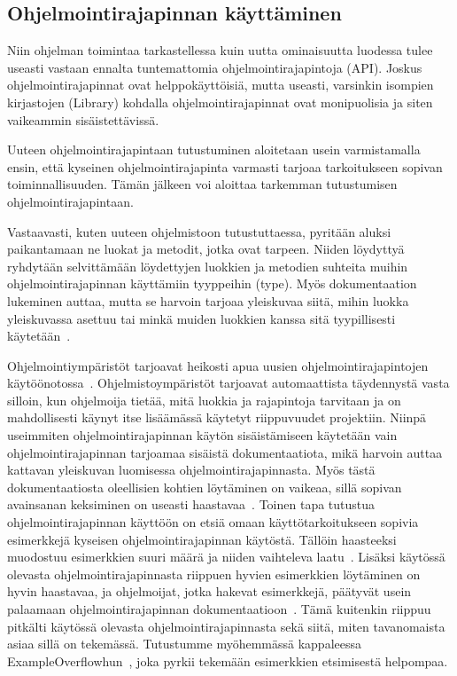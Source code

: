 \documentclass[finnish]{tktltiki2}
\theoremstyle{definition}
\theoremstyle{remark}
\begin{document}
\subsection{Ohjelmointirajapinnan käyttäminen}
Niin ohjelman toimintaa tarkastellessa kuin uutta ominaisuutta luodessa tulee useasti vastaan ennalta tuntemattomia ohjelmointirajapintoja (API). Joskus ohjelmointirajapinnat ovat helppokäyttöisiä, mutta useasti, varsinkin isompien kirjastojen (Library) kohdalla ohjelmointirajapinnat ovat monipuolisia ja siten vaikeammin sisäistettävissä.

Uuteen ohjelmointirajapintaan tutustuminen aloitetaan usein varmistamalla ensin, että kyseinen ohjelmointirajapinta varmasti tarjoaa tarkoitukseen sopivan toiminnallisuuden. Tämän jälkeen voi aloittaa tarkemman tutustumisen ohjelmointirajapintaan.

Vastaavasti, kuten uuteen ohjelmistoon tutustuttaessa, pyritään aluksi paikantamaan ne luokat ja metodit, jotka ovat tarpeen. Niiden löydyttyä ryhdytään selvittämään löydettyjen luokkien ja metodien suhteita muihin ohjelmointirajapinnan käyttämiin tyyppeihin (type). Myös dokumentaation lukeminen auttaa, mutta se harvoin tarjoaa yleiskuvaa siitä, mihin luokka yleiskuvassa asettuu tai minkä muiden luokkien kanssa sitä tyypillisesti käytetään~\cite{asking-and-answering-api-questions}.

Ohjelmointiympäristöt tarjoavat heikosti apua uusien ohjelmointirajapintojen käytöönotossa~\cite{jungloid-mining}. Ohjelmistoympäristöt tarjoavat automaattista täydennystä vasta silloin, kun ohjelmoija tietää, mitä luokkia ja rajapintoja tarvitaan ja on mahdollisesti käynyt itse lisäämässä käytetyt riippuvuudet projektiin. Niinpä useimmiten ohjelmointirajapinnan käytön sisäistämiseen käytetään vain ohjelmointirajapinnan tarjoamaa sisäistä dokumentaatiota, mikä harvoin auttaa kattavan yleiskuvan luomisessa ohjelmointirajapinnasta. Myös tästä dokumentaatiosta oleellisien kohtien löytäminen on vaikeaa, sillä sopivan avainsanan keksiminen on useasti haastavaa~\cite{what-to-search-for}.
Toinen tapa tutustua ohjelmointirajapinnan käyttöön on etsiä omaan käyttötarkoitukseen sopivia esimerkkejä kyseisen ohjelmointirajapinnan käytöstä. Tällöin haasteeksi muodostuu esimerkkien suuri määrä ja niiden vaihteleva laatu~\cite{example-overflow-social-media-for-code-recommendations}. Lisäksi käytössä olevasta ohjelmointirajapinnasta riippuen hyvien esimerkkien löytäminen on hyvin haastavaa, ja ohjelmoijat, jotka hakevat esimerkkejä, päätyvät usein palaamaan ohjelmointirajapinnan dokumentaatioon~\cite{asking-and-answering-api-questions}. Tämä kuitenkin riippuu pitkälti käytössä olevasta ohjelmointirajapinnasta sekä siitä, miten tavanomaista asiaa sillä on tekemässä. Tutustumme myöhemmässä kappaleessa ExampleOverflowhun~\cite{example-overflow-social-media-for-code-recommendations}, joka pyrkii tekemään esimerkkien etsimisestä helpompaa.
\end{document}
